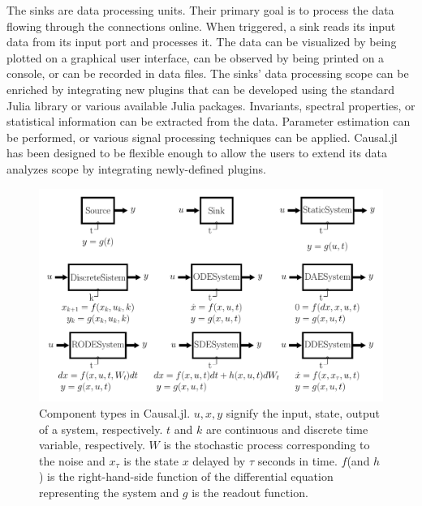 \documentclass{juliacon}
\begin{document}
The sinks are data processing units. Their primary goal is to process the data flowing through the connections online. When triggered, a sink reads its input data from its input port and processes it. The data can be visualized by being plotted on a graphical user interface, can be observed by being printed on a console, or can be recorded in data files. The sinks' data processing scope can be enriched by integrating new plugins that can be developed using the standard Julia library or various available Julia packages. Invariants, spectral properties, or statistical information can be extracted from the data. Parameter estimation can be performed, or various signal processing techniques can be applied. Causal.jl has been designed to be flexible enough to allow the users to extend its data analyzes scope by integrating newly-defined plugins.

\begin{figure}
    \centering
    \includegraphics[width=\linewidth]{figures/ComponentsCompressed/components_compresses.pdf}
    \caption{Component types in Causal.jl. $u, x, y$ signify the input, state, output of a system, respectively. $t$ and $k$ are continuous and discrete time variable, respectively. $W$ is the stochastic process corresponding to the noise and $x_\tau$ is the state $x$ delayed by $\tau$ seconds in time. $f$(and $h$) is the right-hand-side function of the differential equation representing the system and $g$ is the readout function.}
    \label{fig: component types}
\end{figure}
\end{document}
